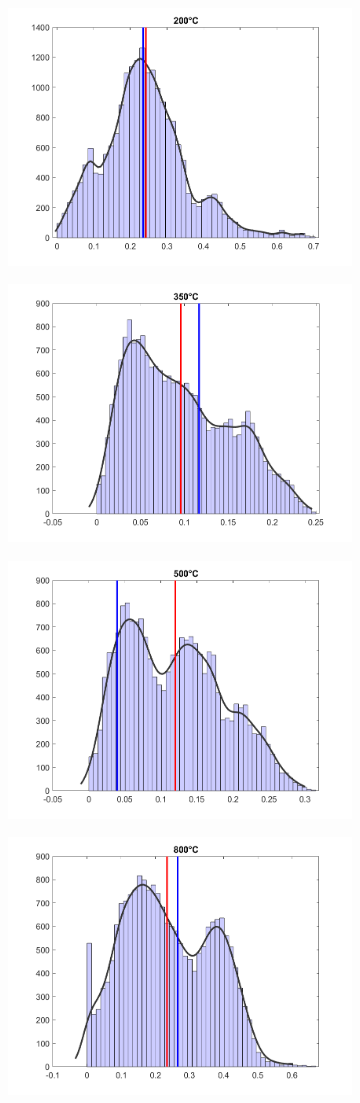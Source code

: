 \begin{figure}[b]
\begin{subfigure}{}
	\end{subfigure}
	\begin{subfigure}{}
	\centering
	\includegraphics[width = 0.45\linewidth]{figures/histograph/histo4.png}
	\end{subfigure}
	\begin{subfigure}{}
	\centering
	\includegraphics[width = 0.45\linewidth]{figures/histograph/histo5.png}
	\end{subfigure}
	\begin{subfigure}{}
	\centering
	\includegraphics[width = 0.45\linewidth]{figures/histograph/histo6.png}
	\end{subfigure}
	\begin{subfigure}{}
	\centering
	\includegraphics[width = 0.45\linewidth]{figures/histograph/histo7.png}

\end{subfigure}
\end{figure}
